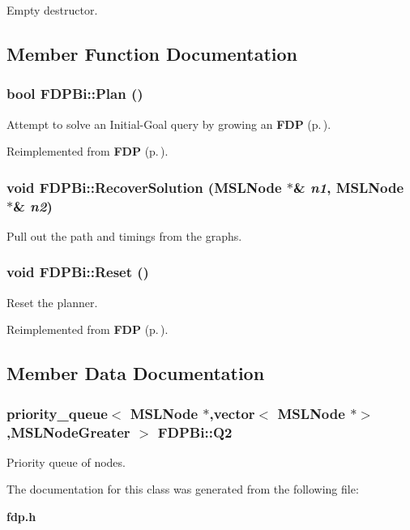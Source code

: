 Empty destructor.



\subsection{Member Function Documentation}
\subsubsection{\setlength{\rightskip}{0pt plus 5cm}bool FDPBi::Plan ()\hspace{0.3cm}{\tt  [virtual]}}\label{class_FDPBi_a3}


Attempt to solve an Initial-Goal query by growing an {\bf FDP} {\rm (p.\,\pageref{class_FDP})}.



Reimplemented from {\bf FDP} {\rm (p.\,\pageref{class_FDP_a3})}.
\subsubsection{\setlength{\rightskip}{0pt plus 5cm}void FDPBi::Recover\-Solution ({\bf MSLNode} $\ast$\& {\em n1}, {\bf MSLNode} $\ast$\& {\em n2})\hspace{0.3cm}{\tt  [protected]}}\label{class_FDPBi_b0}


Pull out the path and timings from the graphs.

\subsubsection{\setlength{\rightskip}{0pt plus 5cm}void FDPBi::Reset ()\hspace{0.3cm}{\tt  [virtual]}}\label{class_FDPBi_a2}


Reset the planner.



Reimplemented from {\bf FDP} {\rm (p.\,\pageref{class_FDP_a2})}.

\subsection{Member Data Documentation}
\subsubsection{\setlength{\rightskip}{0pt plus 5cm}priority\_\-queue$<$ {\bf MSLNode} $\ast$,vector$<$ {\bf MSLNode} $\ast$$>$,{\bf MSLNode\-Greater} $>$ FDPBi::Q2\hspace{0.3cm}{\tt  [protected]}}\label{class_FDPBi_n0}


Priority queue of nodes.



The documentation for this class was generated from the following file:\begin{CompactItemize}
\item 
{\bf fdp.h}\end{CompactItemize}
